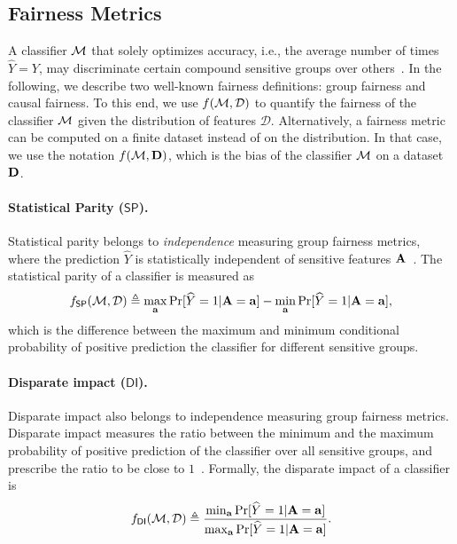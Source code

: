 \subsection{Fairness Metrics}

A classifier $\mathcal{M}$ that solely optimizes accuracy, i.e., the average number of times $\widehat{Y} = Y$, may discriminate certain compound sensitive groups over others~\cite{chouldechova2020snapshot}. In the following, we describe two well-known fairness definitions: group fairness and causal fairness. To this end, we use $ f(\mathcal{M}, \mathcal{D}) $ to quantify the fairness of the classifier $ \mathcal{M} $ given the distribution of features $ \mathcal{D} $. Alternatively, a fairness metric can be computed on a finite dataset instead of on the distribution. In that case, we use the notation $ f(\mathcal{M}, \mathbf{D}) $, which is the bias of the classifier $ \mathcal{M} $ on a dataset $ \mathbf{D} $. 

\paragraph{Statistical Parity ($ \mathsf{SP} $).} Statistical parity belongs to \textit{independence} measuring group fairness metrics, where the prediction $ \widehat{Y} $ is statistically independent of sensitive features $ \mathbf{A} $~\cite{feldman2015certifying}.  The statistical parity of  a classifier is measured as 
\[ f_{\mathsf{SP}}(\mathcal{M}, \mathcal{D}) \triangleq \max_{\mathbf{a}}\Pr[\widehat{Y} =1 | \mathbf{A} = \mathbf{a}] - \min_{\mathbf{a}}\Pr[\widehat{Y} =1 | \mathbf{A} = \mathbf{a}], \] which is the difference between the maximum and minimum conditional probability of positive prediction the classifier for different sensitive groups.


\paragraph{Disparate impact ($ \mathsf{DI} $).} Disparate impact also belongs to independence measuring group fairness metrics. Disparate impact measures the ratio between the minimum and the maximum probability of positive prediction of the classifier over all sensitive groups, and prescribe the ratio to be close to $1$~\cite{feldman2015certifying}.  Formally, the disparate impact of a classifier is 
\[
f_{\mathsf{DI}}(\mathcal{M}, \mathcal{D}) \triangleq \frac{\min_{\mathbf{a}} \Pr[\widehat{Y} =1 | \mathbf{A} =  \mathbf{a}]}{\max_{\mathbf{a}} \Pr[\widehat{Y} =1 | \mathbf{A} =  \mathbf{a}]}.
\]



